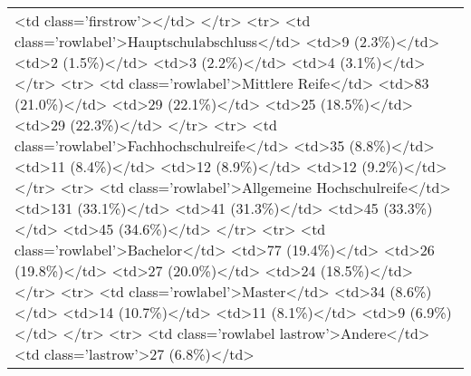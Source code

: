 \begin{table}[!tbp]
\begin{center}
\begin{tabular}{l}
\textless td class='firstrow'\textgreater \textless /td\textgreater 
\textless /tr\textgreater 
\textless tr\textgreater 
\textless td class='rowlabel'\textgreater Hauptschulabschluss\textless /td\textgreater 
\textless td\textgreater 9 (2.3\%)\textless /td\textgreater 
\textless td\textgreater 2 (1.5\%)\textless /td\textgreater 
\textless td\textgreater 3 (2.2\%)\textless /td\textgreater 
\textless td\textgreater 4 (3.1\%)\textless /td\textgreater 
\textless /tr\textgreater 
\textless tr\textgreater 
\textless td class='rowlabel'\textgreater Mittlere Reife\textless /td\textgreater 
\textless td\textgreater 83 (21.0\%)\textless /td\textgreater 
\textless td\textgreater 29 (22.1\%)\textless /td\textgreater 
\textless td\textgreater 25 (18.5\%)\textless /td\textgreater 
\textless td\textgreater 29 (22.3\%)\textless /td\textgreater 
\textless /tr\textgreater 
\textless tr\textgreater 
\textless td class='rowlabel'\textgreater Fachhochschulreife\textless /td\textgreater 
\textless td\textgreater 35 (8.8\%)\textless /td\textgreater 
\textless td\textgreater 11 (8.4\%)\textless /td\textgreater 
\textless td\textgreater 12 (8.9\%)\textless /td\textgreater 
\textless td\textgreater 12 (9.2\%)\textless /td\textgreater 
\textless /tr\textgreater 
\textless tr\textgreater 
\textless td class='rowlabel'\textgreater Allgemeine Hochschulreife\textless /td\textgreater 
\textless td\textgreater 131 (33.1\%)\textless /td\textgreater 
\textless td\textgreater 41 (31.3\%)\textless /td\textgreater 
\textless td\textgreater 45 (33.3\%)\textless /td\textgreater 
\textless td\textgreater 45 (34.6\%)\textless /td\textgreater 
\textless /tr\textgreater 
\textless tr\textgreater 
\textless td class='rowlabel'\textgreater Bachelor\textless /td\textgreater 
\textless td\textgreater 77 (19.4\%)\textless /td\textgreater 
\textless td\textgreater 26 (19.8\%)\textless /td\textgreater 
\textless td\textgreater 27 (20.0\%)\textless /td\textgreater 
\textless td\textgreater 24 (18.5\%)\textless /td\textgreater 
\textless /tr\textgreater 
\textless tr\textgreater 
\textless td class='rowlabel'\textgreater Master\textless /td\textgreater 
\textless td\textgreater 34 (8.6\%)\textless /td\textgreater 
\textless td\textgreater 14 (10.7\%)\textless /td\textgreater 
\textless td\textgreater 11 (8.1\%)\textless /td\textgreater 
\textless td\textgreater 9 (6.9\%)\textless /td\textgreater 
\textless /tr\textgreater 
\textless tr\textgreater 
\textless td class='rowlabel lastrow'\textgreater Andere\textless /td\textgreater 
\textless td class='lastrow'\textgreater 27 (6.8\%)\textless /td\textgreater 

\end{tabular}
\end{center}
\end{table}
